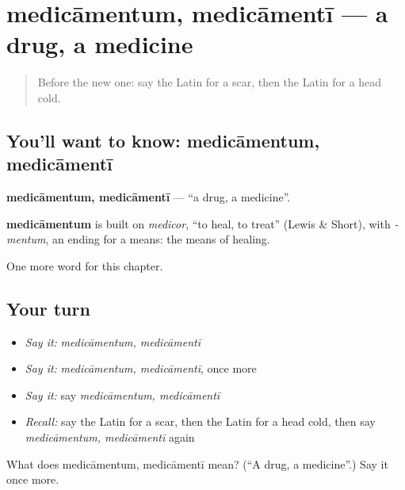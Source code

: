 \section[medicāmentum, medicāmentī]{medicāmentum, medicāmentī — a drug, a medicine}

\label{lesson:LA-C205-medicamentum}



\begin{quote}
Before the new one: say the Latin for a scar, then the Latin for a head cold.
\end{quote}

\subsection*{You'll want to know: medicāmentum, medicāmentī}
\textbf{medicāmentum, medicāmentī} — \textquotedblleft{}a drug, a medicine\textquotedblright{}.

\begin{cousinweb}
\textbf{medicāmentum} is built on \emph{medicor}, \textquotedblleft{}to heal, to treat\textquotedblright{} (Lewis \& Short), with \emph{-mentum}, an ending for a means: the means of healing.
\end{cousinweb}

\begin{grammarlens}[title={What you've built}]
One more word for this chapter.
\end{grammarlens}

\subsection*{Your turn}
\begin{itemize}
\raggedright
  \item \emph{Say it:} \emph{medicāmentum, medicāmentī}
  \item \emph{Say it:} \emph{medicāmentum, medicāmentī}, once more
  \item \emph{Say it:} say \emph{medicāmentum, medicāmentī}
  \item \emph{Recall:} say the Latin for a scar, then the Latin for a head cold, then say \emph{medicāmentum, medicāmentī} again
\end{itemize}

\begin{tcolorbox}[breakable,colback=teal!4,colframe=teal!35!black,title={Before you move on}]
What does medicāmentum, medicāmentī mean? (\textquotedblleft{}A drug, a medicine\textquotedblright{}.) Say it once more.
\end{tcolorbox}
